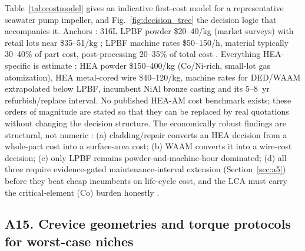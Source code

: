 Table~\ref{tab:costmodel} gives an indicative first-cost model for a representative seawater pump impeller, and Fig.~\ref{fig:decision_tree} the decision logic that accompanies it. Anchors \evid{}: 316L LPBF powder \$20--40/kg (market surveys) with retail lots near \$35--51/kg \cite{cost_buyer2025,cost_lpbf2026}; LPBF machine rates \$50--150/h, material typically 30--40\% of part cost, post-processing 20--35\% of total cost \cite{cost_lpbf2026,printer_guide2026}. Everything HEA-specific is estimate \prop{}: HEA powder \$150--400/kg (Co/Ni-rich, small-lot gas atomization), HEA metal-cored wire \$40--120/kg, machine rates for DED/WAAM extrapolated below LPBF, incumbent NiAl bronze casting and its 5--8~yr refurbish/replace interval. No published HEA-AM cost benchmark exists; these orders of magnitude are stated so that they can be replaced by real quotations without changing the decision structure. The economically robust findings are structural, not numeric \prop{}: (a) cladding/repair converts an HEA decision from a whole-part cost into a surface-area cost; (b) WAAM converts it into a wire-cost decision; (c) only LPBF remains powder-and-machine-hour dominated; (d) all three require evidence-gated maintenance-interval extension (Section~\ref{sec:a5}) before they beat cheap incumbents on life-cycle cost, and the LCA must carry the critical-element (Co) burden honestly \cite{nass2025marine}.

\subsection{A15. Crevice geometries and torque protocols for worst-case niches}
\label{sec:a15}

